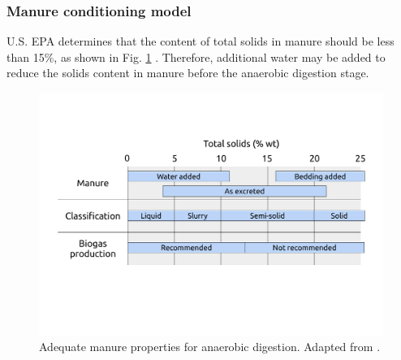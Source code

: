\begin{refsection}[referencesCh4]
\subsubsection{Manure conditioning model}
U.S. EPA determines that the content of total solids in manure should be less than 15\%, as shown in Fig. \ref{fig:TS_max} \citep{AgSTARHandbook}. Therefore, additional water may be added to reduce the solids content in manure before the anaerobic digestion stage.
\begin{figure}[h]
	\centering
	\includegraphics[width=0.7\linewidth, trim=1cm 4cm 1cm 2.5cm, clip]{gfx/AppendixC/water_manure_properties} 
	\caption{Adequate manure properties for anaerobic digestion. Adapted from \protect\citet{AgSTARHandbook}.}
	\label{fig:TS_max}
\end{figure}


\end{refsection}
